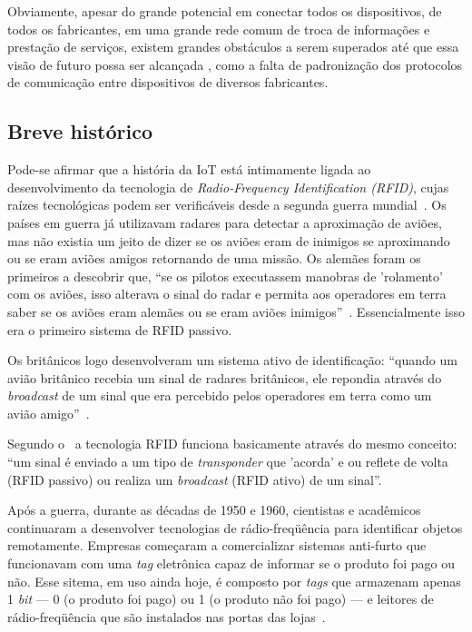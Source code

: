 \documentclass[pdftex, brazil, 12pt, twoside]{article}
\newcommand{\ingles}[1]{\textit{#1}}
\begin{document}
Obviamente, apesar do grande potencial em conectar todos os dispositivos, de todos
os fabricantes, em uma grande rede comum de troca de informações e prestação de
serviços, existem grandes obstáculos a serem superados até que essa visão de futuro
possa ser alcançada \citep{UKGOSWalportIoT2014}, como a falta de padronização dos
protocolos de comunicação entre dispositivos de diversos fabricantes.


\subsection{Breve histórico}
\label{o-que-e-iot-historia}

Pode-se afirmar que a história da IoT está intimamente ligada ao desenvolvimento
da tecnologia de \ingles{Radio-Frequency Identification (RFID)}, cujas raízes
tecnológicas podem ser verificáveis desde a segunda guerra mundial~\citep{IEEEIoTDefinition}.
Os países em guerra já utilizavam radares para detectar a aproximação de aviões,
mas não existia um jeito de dizer se os aviões eram de inimigos se aproximando
ou se eram aviões amigos retornando de uma missão. Os alemães foram os
primeiros a descobrir que, ``se os pilotos executassem manobras de 'rolamento'
com os aviões, isso alterava o sinal do radar e permita aos operadores em terra
saber se os aviões eram alemães ou se eram aviões inimigos''~\citep[][p.\ 8]{IEEEIoTDefinition}.
Essencialmente isso era o primeiro sistema de RFID passivo.

Os britânicos logo desenvolveram um sistema ativo de identificação: ``quando
um avião britânico recebia um sinal de radares britânicos, ele repondia através
do \emph{broadcast} de um sinal que era percebido pelos operadores em terra
como um avião amigo''~\citep[][p.\ 8]{IEEEIoTDefinition}.

Segundo o~\citet[][p.\ 8]{IEEEIoTDefinition} a tecnologia RFID funciona basicamente
através do mesmo conceito: ``um sinal é enviado a um tipo de \emph{transponder}
que 'acorda' e ou reflete de volta (RFID passivo) ou realiza
um \emph{broadcast} (RFID ativo) de um sinal''.

Após a guerra, durante as décadas de 1950 e 1960, cientistas e acadêmicos
continuaram a desenvolver tecnologias de rádio-freqüência para identificar
objetos remotamente. Empresas começaram a comercializar sistemas anti-furto
que funcionavam com uma \ingles{tag} eletrônica capaz de informar se o produto
foi pago ou não. Esse sitema, em uso ainda hoje, é composto por \ingles{tags}
que armazenam apenas 1 \ingles{bit} --- 0 (o produto foi pago) ou 1 (o produto não
foi pago) --- e leitores de rádio-freqüência que são instalados nas portas
das lojas~\citep{IEEEIoTDefinition}.
\end{document}
